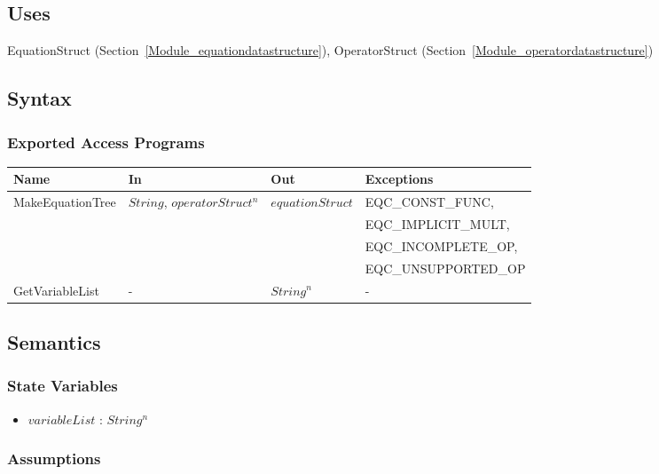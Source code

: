 \documentclass[12pt, titlepage]{article}
\begin{document}
\subsection{Uses}

EquationStruct (Section~\ref{Module_equationdatastructure}), OperatorStruct (Section~\ref{Module_operatordatastructure})

\subsection{Syntax}

\subsubsection{Exported Access Programs}

\begin{center}
	\begin{tabular}{p{3.2cm} p{2.8cm} p{3cm} p{5cm}}
		\hline
		\textbf{Name} & \textbf{In} & \textbf{Out} & \textbf{Exceptions} \\
		\hline
		\multirow{4}{3.2cm}{MakeEquationTree} & \multirow{4}{2.8cm}{$String$, 
		$operatorStruct^n$} & \multirow{4}{3cm}{$equationStruct$} & 
		EQC\_CONST\_FUNC, \\	
		& & & EQC\_IMPLICIT\_MULT, \\
		& & & EQC\_INCOMPLETE\_OP, \\
		& & & EQC\_UNSUPPORTED\_OP \\
		GetVariableList & - & $String^n$ & - \\
		\hline
	\end{tabular}
\end{center}

\subsection{Semantics}

\subsubsection{State Variables}

\begin{itemize}
	\item $variableList$ : $String^n$
\end{itemize}

\subsubsection{Assumptions}
\end{document}
